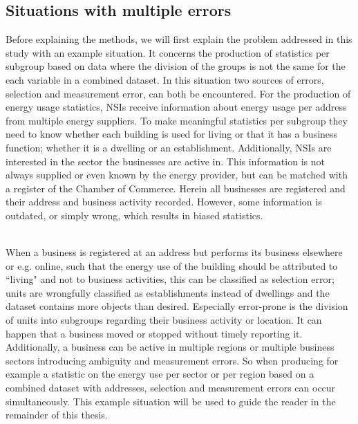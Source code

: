 \documentclass[a4paper, 11pt]{article} %
\begin{document}
\subsection{Situations with multiple errors} \label{energyexample}
Before explaining the methods, we will first explain the problem addressed in this study with an example situation. It concerns the production of statistics per subgroup based on data where the division of the groups is not the same for the each variable in a combined dataset. In this situation two sources of errors, selection and measurement error, can both be encountered. 
For the production of energy usage statistics, NSIs receive information about energy usage per address from multiple energy suppliers. To make meaningful statistics per subgroup they need to know whether each building is used for living or that it has a business function; whether it is a dwelling or an establishment. Additionally, NSIs are interested in the sector the businesses are active in. This information is not always supplied or even known by the energy provider, but can be matched with a register of the Chamber of Commerce. Herein all businesses are registered and their address and business activity recorded. However, some information is outdated, or simply wrong, which results in biased statistics.

\\When a business is registered at an address but performs its business elsewhere or e.g. online, such that the energy use of the building should be attributed to ``living" and not to business activities, this can be classified as selection error; units are wrongfully classified as establishments instead of dwellings and the dataset contains more objects than desired. Especially error-prone is the division of units into subgroups regarding their business activity or location. It can happen that a business moved or stopped without timely reporting it. Additionally, a business can be active in multiple regions or multiple business sectors introducing ambiguity and measurement errors. So when producing for example a statistic on the energy use per sector or per region based on a combined dataset with addresses, selection and measurement errors can occur simultaneously. This example situation will be used to guide the reader in the remainder of this thesis.
\end{document}

